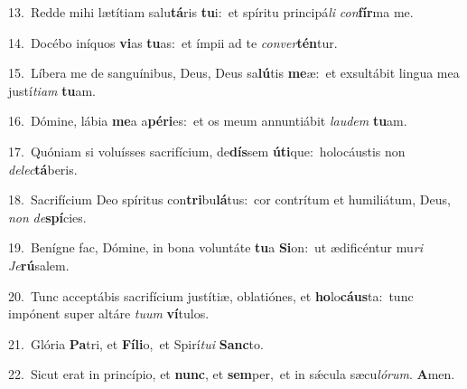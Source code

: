 {\numbfont\textcolor{\numbcolor}{13.}}~Redde mihi lætítiam salu\-\textbf{tá}\-ris \textbf{tu}\-i:~\star et spíritu principá\textit{li} \textit{con}\-\textbf{fír}ma me.\par
{\numbfont\textcolor{\numbcolor}{14.}}~Docébo iníquos \textbf{vi}\-as \textbf{tu}\-as:~\star et ímpii ad te \textit{con}\-\textit{ver}\textbf{tén}tur.\par
{\numbfont\textcolor{\numbcolor}{15.}}~Líbera me de sanguínibus, Deus, Deus sa\-\textbf{lú}\-tis \textbf{me}\-æ:~\star et exsultábit lingua mea justí\-\textit{ti}\-\textit{am} \textbf{tu}\-am.\par
{\numbfont\textcolor{\numbcolor}{16.}}~Dómine, lábia \textbf{me}\-a a\-\textbf{pé}\-\textbf{ri}es:~\star et os meum annuntiábit \textit{lau}\-\textit{dem} \textbf{tu}\-am.\par
{\numbfont\textcolor{\numbcolor}{17.}}~Quóniam si voluísses sacrifícium, de\-\textbf{dís}\-sem \textbf{ú}\-\textbf{ti}que:~\star holocáustis non \textit{de}\-\textit{lec}\textbf{tá}beris.\par
{\numbfont\textcolor{\numbcolor}{18.}}~Sacrifícium Deo spíritus con\-\textbf{tri}\-bu\-\textbf{lá}\-tus:~\star cor contrítum et humiliátum, Deus, \textit{non} \textit{de}\-\textbf{spí}cies.\par
{\numbfont\textcolor{\numbcolor}{19.}}~Benígne fac, Dómine, in bona voluntáte \textbf{tu}\-a \textbf{Si}\-on:~\star ut ædificéntur mu\textit{ri} \textit{Je}\-\textbf{rú}salem.\par
{\numbfont\textcolor{\numbcolor}{20.}}~Tunc acceptábis sacrifícium justítiæ, oblatiónes, et \textbf{ho}\-lo\-\textbf{cáus}\-ta:~\star tunc impónent super altáre \textit{tu}\-\textit{um} \textbf{ví}\-tulos.\par
{\numbfont\textcolor{\numbcolor}{21.}}~Glória \textbf{Pa}\-tri, et \textbf{Fí}\-\textbf{li}o,~\star et Spirí\-\textit{tu}\-\textit{i} \textbf{Sanc}\-to.\par
{\numbfont\textcolor{\numbcolor}{22.}}~Sicut erat in princípio, et \textbf{nunc}\-, et \textbf{sem}\-per,~\star et in sǽcula sæcu\-\textit{ló}\-\textit{rum}. \textbf{A}\-men.\par
